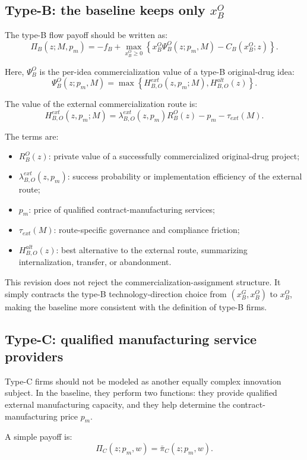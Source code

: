 \documentclass[12pt]{article}
\begin{document}
\subsection{Type-B: the baseline keeps only $x_B^O$}

The type-B flow payoff should be written as:
\[
\Pi_B(z;M,p_m)
=
-f_B
+
\max_{x_B^O\ge 0}
\left\{
x_B^O\Psi_B^O(z;p_m,M)
-
C_B(x_B^O;z)
\right\}.
\]

Here, $\Psi_B^O$ is the per-idea commercialization value of a type-B original-drug idea:
\[
\Psi_B^O(z;p_m,M)
=
\max
\left\{
H_{B,O}^{ext}(z,p_m;M),
H_{B,O}^{alt}(z)
\right\}.
\]

The value of the external commercialization route is:
\[
H_{B,O}^{ext}(z,p_m;M)
=
\lambda_{B,O}^{ext}(z,p_m)R_B^O(z)
-
p_m
-
\tau_{ext}(M).
\]

The terms are:
\begin{itemize}
    \item $R_B^O(z)$: private value of a successfully commercialized original-drug project;
    \item $\lambda_{B,O}^{ext}(z,p_m)$: success probability or implementation efficiency of the external route;
    \item $p_m$: price of qualified contract-manufacturing services;
    \item $\tau_{ext}(M)$: route-specific governance and compliance friction;
    \item $H_{B,O}^{alt}(z)$: best alternative to the external route, summarizing internalization, transfer, or abandonment.
\end{itemize}

This revision does not reject the commercialization-assignment structure. It simply contracts the type-B technology-direction choice from $(x_B^G,x_B^O)$ to $x_B^O$, making the baseline more consistent with the definition of type-B firms.

\subsection{Type-C: qualified manufacturing service providers}

Type-C firms should not be modeled as another equally complex innovation subject. In the baseline, they perform two functions: they provide qualified external manufacturing capacity, and they help determine the contract-manufacturing price $p_m$.

A simple payoff is:
\[
\Pi_C(z;p_m,w)
=
\bar{\pi}_C(z;p_m,w).
\]
\end{document}

